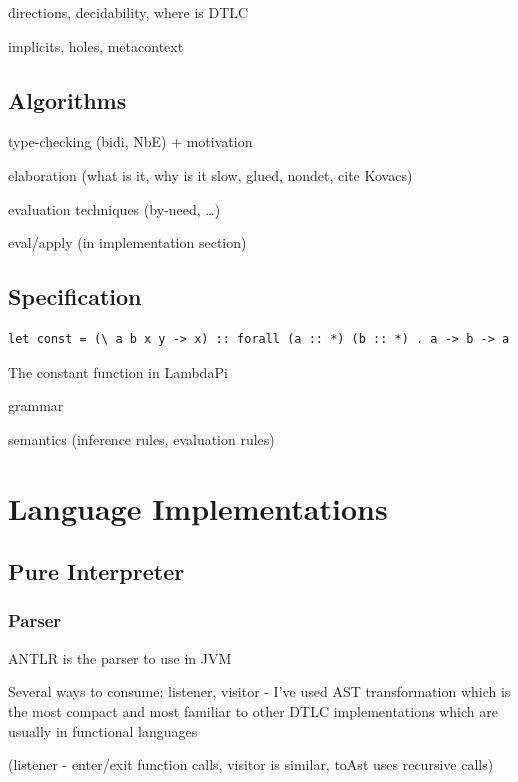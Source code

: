 \documentclass[english,zadani,odsaz]{fitthesis}
\begin{document}
directions, decidability, where is DTLC

implicits, holes, metacontext

\section{Algorithms}
\label{sec:org8c81d3d}
type-checking (bidi, NbE) + motivation

elaboration (what is it, why is it slow, glued, nondet, cite Kovacs)

evaluation techniques (by-need, \ldots{})

eval/apply (in implementation section)

\section{Specification}
\label{sec:org6d14800}
\begin{listing}[!htpb]
\begin{verbatim}
let const = (\ a b x y -> x) :: forall (a :: *) (b :: *) . a -> b -> a
\end{verbatim}
\caption{The constant function in LambdaPi}
\end{listing}

grammar

semantics (inference rules, evaluation rules)

\chapter{Language Implementations}
\label{sec:orgdf575c8}
\section{Pure Interpreter}
\label{sec:org26ee3d5}
\subsection{Parser}
\label{sec:org7cfeb08}
ANTLR is the parser to use in JVM

Several ways to consume: listener, visitor - I've used AST transformation which
is the most compact and most familiar to other DTLC implementations which are
usually in functional languages

(listener - enter/exit function calls, visitor is similar, toAst uses recursive calls)
\end{document}
